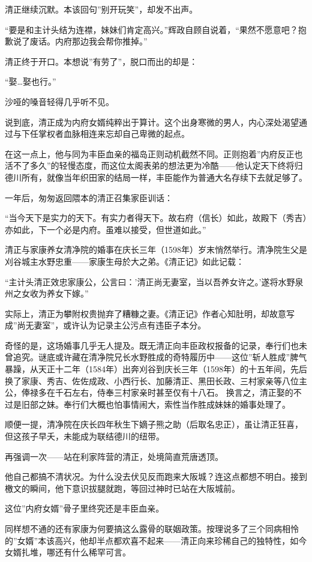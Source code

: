 \documentclass[
]{article}
\begin{document}
清正继续沉默。本该回句''别开玩笑''，却发不出声。

``要是和主计头结为连襟，妹妹们肯定高兴。''辉政自顾自说着，``果然不愿意吧？抱歉说了废话。内府那边我会帮你推掉。''

清正终于开口。本想说''有劳了''，脱口而出的却是：

``娶\ldots 娶也行。''

沙哑的嗓音轻得几乎听不见。

说到底，清正成为内府女婿纯粹出于算计。这个出身寒微的男人，内心深处渴望通过与下任掌权者血脉相连来忘却自己卑微的起点。

在这一点上，他与同为丰臣血亲的福岛正则动机截然不同。正则抱着''内府反正也活不了多久''的轻慢态度，而这位太阁表弟的想法更为冷酷------他认定天下终将归德川所有，就像当年织田家的结局一样，丰臣能作为普通大名存续下去就足够了。

一年后，匆匆返回隈本的清正召集家臣训话：

``当今天下是实力的天下。有实力者得天下。故右府（信长）如此，故殿下（秀吉）亦如此，下一个必是内府。虽难以接受，但世道如此。''

清正与家康养女清净院的婚事在庆长三年（1598年）岁末悄然举行。清净院生父是刈谷城主水野忠重------家康生母於大之弟。《清正记》如此记载：

``主计头清正效忠家康公，公言曰：'清正尚无妻室，当以吾养女许之。'遂将水野泉州之女收为养女下嫁。''

实际上，清正为攀附权贵抛弃了糟糠之妻。《清正记》作者心知肚明，却故意写成''尚无妻室''，或许认为记录主公污点有违臣子本分。

奇怪的是，这场婚事几乎无人提及。既无清正向丰臣政权报备的记录，奉行们也未曾追究。谜底或许藏在清净院兄长水野胜成的奇特履历中------这位''斩人胜成''脾气暴躁，从天正十二年（1584年）出奔刈谷到庆长三年（1598年）的十五年间，先后换了家康、秀吉、佐佐成政、小西行长、加藤清正、黑田长政、三村家亲等八位主公，俸禄多在千石左右，侍奉三村家亲时甚至仅有十八石。 换言之，清正娶的不过是旧部之妹。奉行们大概也怕事情闹大，索性当作胜成妹妹的婚事处理了。

顺便一提，清净院在庆长四年秋生下嫡子熊之助（后取名忠正），虽让清正狂喜，但这孩子早夭，未能成为联结德川的纽带。

再强调一次------站在利家阵营的清正，处境简直荒唐透顶。

他自己都搞不清状况。为什么没去伏见反而跑来大阪城？连这点都想不明白。接到檄文的瞬间，他下意识拔腿就跑，等回过神时已站在大阪城前。

这位''内府女婿''骨子里终究还是丰臣血亲。

同样想不通的还有家康为何要搞这么露骨的联姻政策。按理说多了三个同病相怜的''女婿''本该高兴，他却半点都欢喜不起来------清正向来珍稀自己的独特性，如今女婿扎堆，哪还有什么稀罕可言。
\end{document}
